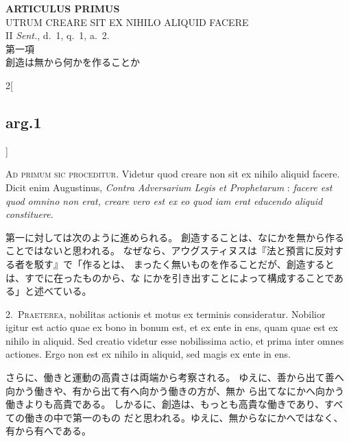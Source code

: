 \documentclass[paper=a4paper,fontsize=10pt,jafontsize=9pt,titlepage]{jlreq}
\begin{document}
\newpage
{}
{}
\setcounter{section}{1}
\setcounter{subsection}{0}

\begin{center}
{\Large {\bfseries ARTICULUS PRIMUS}}\\
 {\large UTRUM CREARE SIT EX NIHILO ALIQUID FACERE}\\
 {\footnotesize II {\itshape Sent.}, d.~1, q.~1, a.~2.}\\
 {\Large 第一項\\創造は無から何かを作ることか}
\end{center}

\begin{paracol}{2}[\subsection{arg.1}]

{\huge A}{\scshape d primum sic proceditur}. Videtur quod creare non sit ex nihilo aliquid
 facere. Dicit enim Augustinus, {\itshape Contra Adversarium Legis et
 Prophetarum} : {\itshape facere est quod omnino non erat, creare vero est ex
 eo quod iam erat educendo aliquid constituere}.

\switchcolumn

第一に対しては次のように進められる。
創造することは、なにかを無から作ることではないと思われる。
なぜなら、アウグスティヌスは『法と預言に反対する者を駁す』で「作るとは、
 まったく無いものを作ることだが、創造するとは、すでに在ったものから、な
 にかを引き出すことによって構成することである」と述べている。


2.~{\scshape Praeterea}, nobilitas actionis et motus ex
 terminis consideratur. Nobilior igitur est actio quae ex bono in bonum
 est, et ex ente in ens, quam quae est ex nihilo in aliquid. Sed creatio
 videtur esse nobilissima actio, et prima inter omnes actiones. Ergo non
 est ex nihilo in aliquid, sed magis ex ente in ens.

\switchcolumn

さらに、働きと運動の高貴さは両端から考察される。
ゆえに、善から出て善へ向かう働きや、有から出て有へ向かう働きの方が、無か
 ら出てなにかへ向かう働きよりも高貴である。
しかるに、創造は、もっとも高貴な働きであり、すべての働きの中で第一のもの
 だと思われる。ゆえに、無からなにかへではなく、有から有へである。


\end{paracol}
\end{document}
